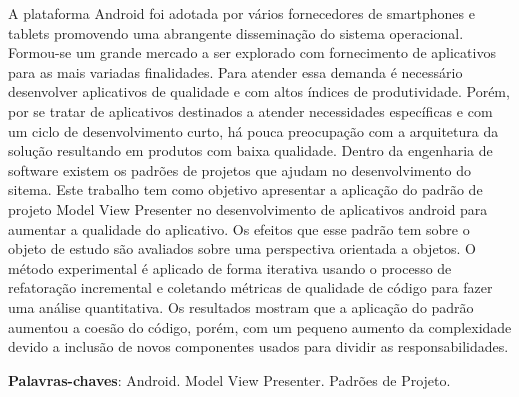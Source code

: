 \documentclass[
	12pt,				%
	a4paper,			%
	oneside,
	english,			%
	brazil,				%
	]{abntex2}
\begin{document}
\pretextual

\imprimircapa 

\imprimirfolhaderosto* 


\begin{resumo}
\noindent
A plataforma Android foi adotada por vários fornecedores de smartphones e
tablets promovendo uma abrangente disseminação do sistema operacional.
Formou-se um grande mercado a ser explorado com fornecimento de aplicativos para
as mais variadas finalidades. Para atender essa demanda é necessário
desenvolver aplicativos de qualidade e com altos índices de produtividade. Porém, por
se tratar de aplicativos destinados a atender necessidades específicas e com um
ciclo de desenvolvimento curto, há pouca preocupação com a arquitetura da
solução resultando em produtos com baixa qualidade. Dentro da engenharia de
software existem os padrões de projetos que ajudam no desenvolvimento do sitema.
Este trabalho tem como objetivo apresentar a aplicação do padrão de projeto
Model View Presenter no desenvolvimento de aplicativos android para aumentar a
qualidade do aplicativo. Os efeitos que esse padrão tem sobre o objeto de estudo
são avaliados sobre uma perspectiva orientada a objetos. O método experimental é
aplicado de forma iterativa usando o processo de refatoração incremental e
coletando métricas de qualidade de código para fazer uma análise quantitativa.
Os resultados mostram que a aplicação do padrão aumentou a coesão do código,
porém, com um pequeno aumento da complexidade devido a inclusão de novos
componentes usados para dividir as responsabilidades.

\vspace{\onelineskip}

\noindent
\textbf{Palavras-chaves}: Android. Model View Presenter. Padrões de Projeto.
\end{resumo}
\end{document}
